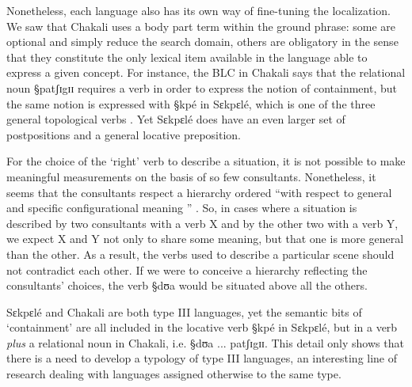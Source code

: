 % 


Nonetheless,  each language also has its own way of fine-tuning
the localization. We saw that Chakali uses a body part term within the ground
phrase: some are optional and simply reduce the search domain, others are
obligatory in the sense that they constitute the only lexical item available in
the
language able to express  a given concept. For instance, the BLC in Chakali
says that the relational noun {\S patʃɪgɪɪ}  requires a verb in order to express
the notion of containment, but the same notion is expressed with {\S kpé} in
Sɛkpɛlé, which is  one of the three general topological verbs
\citep[1079]{Amek07c}. Yet Sɛkpɛlé does have an even larger set of
postpositions and a general locative preposition. 




For the choice of the `right' verb to describe a situation,   it is not possible
to make meaningful measurements on the basis of so few consultants. Nonetheless,
 it seems that the consultants respect a hierarchy ordered ``with respect to
general and specific configurational meaning '' \citep[1074]{Amek07c}. So, in
cases where a situation is described by two consultants with a verb X and by the
other two with a verb Y, we expect X and Y  not only to share some meaning, but
that one is more general than the other. As a result, the verbs used to describe
a particular scene should not contradict each other. If we were to conceive a
hierarchy reflecting the consultants' choices,  the  verb {\S dʊa} would be
situated above all the others.  

Sɛkpɛlé and Chakali are both type III languages, yet the semantic bits of 
`containment' are all included in the  locative verb {\S kpé}  in Sɛkpɛlé, but
in  a verb {\it plus} a relational noun  in Chakali, i.e.  {\S dʊa ...
patʃɪgɪɪ}. This detail only shows that there is a need to develop a typology of 
type
III languages, an interesting line of research dealing with languages assigned
otherwise
to the same type.










